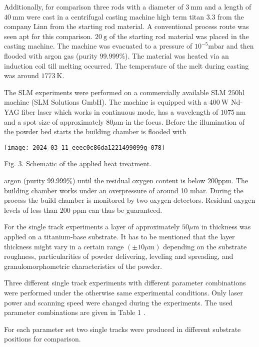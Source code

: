 \documentclass[10pt]{article}
\begin{document}
Additionally, for comparison three rods with a diameter of $3 \mathrm{~mm}$ and a length of $40 \mathrm{~mm}$ were cast in a centrifugal casting machine high term titan 3.3 from the company Linn from the starting rod material. A conventional process route was seen apt for this comparison. $20 \mathrm{~g}$ of the starting rod material was placed in the casting machine. The machine was evacuated to a pressure of $10^{-5} \mathrm{mbar}$ and then flooded with argon gas (purity 99.999\%). The material was heated via an induction coil till melting occurred. The temperature of the melt during casting was around $1773 \mathrm{~K}$.

The SLM experiments were performed on a commercially available SLM $250 \mathrm{hl}$ machine (SLM Solutions GmbH). The machine is equipped with a $400 \mathrm{~W}$ Nd-YAG fiber laser which works in continuous mode, has a wavelength of $1075 \mathrm{~nm}$ and a spot size of approximately $80 \mu \mathrm{m}$ in the focus. Before the illumination of the powder bed starts the building chamber is flooded with

\begin{center}
\texttt{[image: 2024\_03\_11\_eeec0c86da1221499099g-078]}
\end{center}

Fig. 3. Schematic of the applied heat treatment.

argon (purity 99.999\%) until the residual oxygen content is below $200 \mathrm{ppm}$. The building chamber works under an overpressure of around 10 mbar. During the process the build chamber is monitored by two oxygen detectors. Residual oxygen levels of less than 200 ppm can thus be guaranteed.

For the single track experiments a layer of approximately $50 \mu \mathrm{m}$ in thickness was applied on a titanium-base substrate. It has to be mentioned that the layer thickness might vary in a certain range $( \pm 10 \mu \mathrm{m})$ depending on the substrate roughness, particularities of powder delivering, leveling and spreading, and granulomorphometric characteristics of the powder.

Three different single track experiments with different parameter combinations were performed under the otherwise same experimental conditions. Only laser power and scanning speed were changed during the experiments. The used parameter combinations are given in Table 1 .

For each parameter set two single tracks were produced in different substrate positions for comparison.
\end{document}
